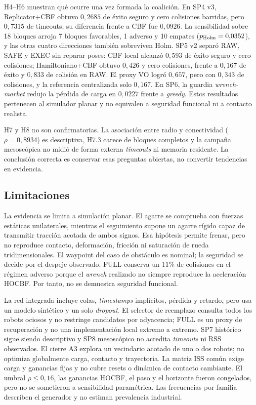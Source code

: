 H4--H6 muestran qué ocurre una vez formada la coalición. En SP4 v3, Replicator+CBF obtuvo $0{,}2685$ de éxito seguro y cero colisiones barridas, pero $0{,}7315$ de timeouts; su diferencia frente a CBF fue $0{,}0926$. La sensibilidad sobre 18 bloques arroja 7 bloques favorables, 1 adverso y 10 empates ($p_{\rm Holm}=0{,}0352$), y las otras cuatro direcciones también sobreviven Holm. SP5 v2 separó RAW, SAFE y EXEC sin reparar poses: CBF local alcanzó $0{,}593$ de éxito seguro y cero colisiones; Hamiltoniano+CBF obtuvo $0{,}426$ y cero colisiones, frente a $0{,}167$ de éxito y $0{,}833$ de colisión en RAW. El proxy VO logró $0{,}657$, pero con $0{,}343$ de colisiones, y la referencia centralizada solo $0{,}167$. En SP6, la guardia \emph{wrench-market} redujo la pérdida de carga en $0{,}0227$ frente a \emph{greedy}. Estos resultados pertenecen al simulador planar y no equivalen a seguridad funcional ni a contacto realista.

H7 y H8 no son confirmatorias. La asociaci\'on entre radio y conectividad ($\rho=0{,}8934$) es descriptiva, H7.3 carece de bloques completos y la campa\~na mesosc\'opica no midi\'o de forma externa \emph{timeouts} ni memoria residente. La conclusi\'on correcta es conservar esas preguntas abiertas, no convertir tendencias en evidencia.

\subsection*{Limitaciones}

La evidencia se limita a simulación planar. El agarre se comprueba con fuerzas estáticas unilaterales, mientras el seguimiento supone un agarre rígido capaz de transmitir tracción acotada de ambos signos. Esa hipótesis permite frenar, pero no reproduce contacto, deformación, fricción ni saturación de rueda tridimensionales. El waypoint del caso de obstáculo es nominal; la seguridad se decide por el despeje observado. FULL conserva un 11\% de colisiones en el régimen adverso porque el \emph{wrench} realizado no siempre reproduce la aceleración HOCBF. Por tanto, no se demuestra seguridad funcional.

La red integrada incluye colas, \emph{timestamps} implícitos, pérdida y retardo, pero usa un modelo sintético y un solo \emph{dropout}. El selector de reemplazo consulta todos los robots ociosos y no restringe candidatos por adyacencia; FULL es un proxy de recuperación y no una implementación local extremo a extremo. SP7 histórico sigue siendo descriptivo y SP8 mesoscópico no acredita \emph{timeouts} ni RSS observados. El cierre A3 explora un vecindario acotado de uno o dos robots; no optimiza globalmente carga, contacto y trayectoria. La matriz ISS común exige carga y ganancias fijas y no cubre resets o dinámica de contacto cambiante. El umbral $\rho\leq0{,}16$, las ganancias HOCBF, el paso y el horizonte fueron congelados, pero no se sometieron a sensibilidad paramétrica. Las frecuencias por familia describen el generador y no estiman prevalencia industrial.
